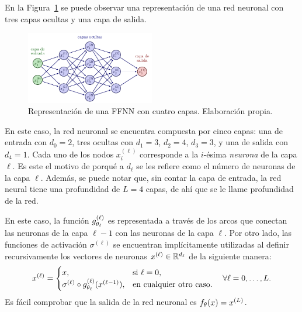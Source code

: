 {{    \begin{example}\label{ex:ejemplo-red-neuronal}
        En la Figura~\ref{fig:ejemplo-red-neuronal} se puede observar una representación de una red neuronal con tres capas ocultas y una capa de salida.

        \begin{figure}[htbp]
            \centering
            \includegraphics[width=0.5\textwidth]{img/neural_network/neural_network_feed_forward.pdf}
            \caption{Representación de una FFNN con cuatro capas. Elaboración propia.}
            \label{fig:ejemplo-red-neuronal}
        \end{figure}

        En este caso, la red neuronal se encuentra compuesta por cinco capas: una de entrada con $d_0 = 2$, tres ocultas con $d_1 = 3$, $d_2 = 4$, $d_3 = 3$, y una de salida con $d_4 = 1$. Cada uno de los nodos $x_i^{(\ell)}$ corresponde a la $i$-ésima \textit{neurona} de la capa $\ell$. Es este el motivo de porqué a $d_\ell$ se les refiere como el número de neuronas de la capa $\ell$. Además, se puede notar que, sin contar la capa de entrada, la red neural tiene una profundidad de $L = 4$ capas, de ahí que se le llame profundidad de la red.

        En este caso, la función $g^{(\ell)}_{{\theta}_\ell}$ es representada a través de los arcos que conectan las neuronas de la capa $\ell-1$ con las neuronas de la capa $\ell$. Por otro lado, las funciones de activación $\sigma^{(\ell)}$ se encuentran implícitamente utilizadas al definir recursivamente los vectores de neuronas $x^{(\ell)} \in \mathbb{R}^{d_\ell}$ de la siguiente manera:
        \begin{equation}
            x^{(\ell)} =
            \begin{cases}
                {x},                                                         & \text{si } \ell = 0,           \\
                \sigma^{(\ell)} \circ g^{(\ell)}_{{\theta}_\ell} (x^{(\ell-1)}), & \text{en cualquier otro caso.}
            \end{cases}
            \quad \forall \ell = 0, \ldots, L.
        \end{equation}
        Es fácil comprobar que la salida de la red neuronal es $f_{{\theta}}({x}) = x^{(L)}$.
    \end{example}

}}
